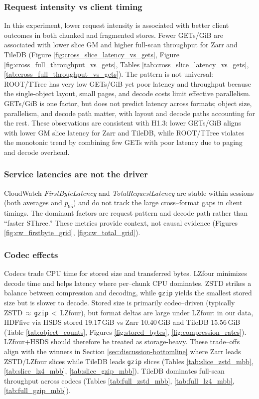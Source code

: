 \documentclass[nomenclature, english, bibtex]{kththesis}
\numberwithin{listing}{chapter}
\begin{document}
\subsubsection{Request intensity vs client timing}
In this experiment, lower request intensity is associated with better client outcomes in both chunked and fragmented stores. Fewer GETs/GiB are associated with lower slice \gls{GM} and higher full-scan throughput for Zarr and TileDB (Figure \ref{fig:cross_slice_latency_vs_gets}, Figure \ref{fig:cross_full_throughput_vs_gets}, Tables \ref{tab:cross_slice_latency_vs_gets}, \ref{tab:cross_full_throughput_vs_gets}). The pattern is not universal: \gls{ROOT}/\gls{TTree} has very low GETs/GiB yet poor latency and throughput because the single-object layout, small pages, and decode costs limit effective parallelism. GETs/GiB is one factor, but does not predict latency across formats; object size, parallelism, and decode path matter, with layout and decode paths accounting for the rest. These observations are consistent with H1.3: lower GETs/GiB aligns with lower \gls{GM} slice latency for Zarr and TileDB, while \gls{ROOT}/\gls{TTree} violates the monotonic trend by combining few GETs with poor latency due to paging and decode overhead.

\subsubsection{Service latencies are not the driver}
CloudWatch \emph{FirstByteLatency} and \emph{TotalRequestLatency} are stable within sessions (both averages and $p_{95}$) and do not track the large cross–format gaps in client timings. The dominant factors are request pattern and decode path rather than “faster \gls{SThree}.” These metrics provide context, not causal evidence (Figures \ref{fig:cw_firstbyte_grid}, \ref{fig:cw_total_grid}).

\subsubsection{Codec effects}
Codecs trade \gls{CPU} time for stored size and transferred bytes. \gls{LZfour} minimizes decode time and helps latency where per–chunk \gls{CPU} dominates. \gls{ZSTD} strikes a balance between compression and decoding, while \texttt{gzip} yields the smallest stored size but is slower to decode. Stored size is primarily codec–driven (typically \gls{ZSTD}\,$\approx$\,\texttt{gzip}\,$<$\,\gls{LZfour}), but format deltas are large under \gls{LZfour}: in our data, \gls{HDFfive} via \gls{HSDS} stored 19.17\,GiB vs Zarr 10.40\,GiB and TileDB 15.56\,GiB (Table \ref{tab:object_counts}, Figures \ref{fig:stored_bytes}, \ref{fig:compression_rates}). \gls{LZfour}+\gls{HSDS} should therefore be treated as storage-heavy. These trade–offs align with the winners in Section \ref{sec:discussion-bottomline} where Zarr leads \gls{ZSTD}/\gls{LZfour} slices while TileDB leads \texttt{gzip} slices (Tables \ref{tab:slice_zstd_mbb}, \ref{tab:slice_lz4_mbb}, \ref{tab:slice_gzip_mbb}). TileDB dominates full-scan throughput across codecs (Tables \ref{tab:full_zstd_mbb}, \ref{tab:full_lz4_mbb}, \ref{tab:full_gzip_mbb}).
\end{document}
